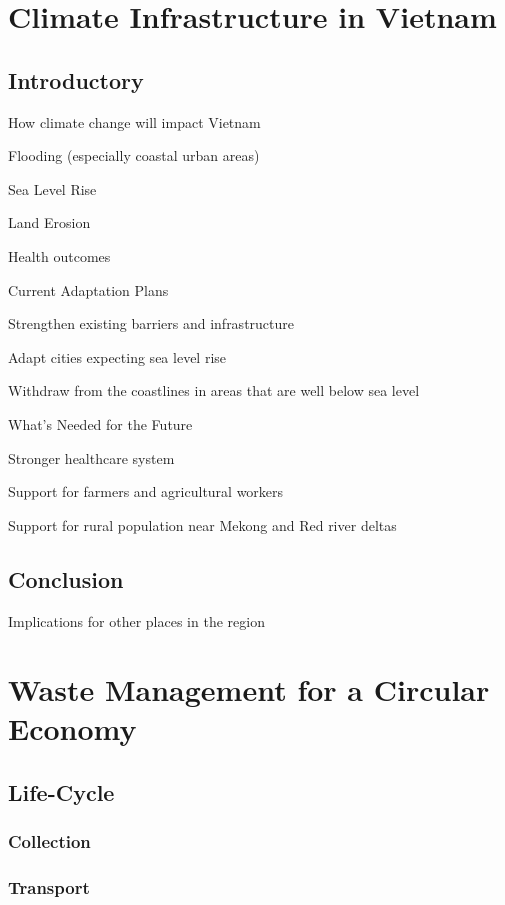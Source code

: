 \documentclass{book}\usepackage{knitr}
\begin{document}
{\chapter{Climate Infrastructure in Vietnam}

\section{Introductory}

How climate change will impact Vietnam

Flooding (especially coastal urban areas)

Sea Level Rise

Land Erosion

Health outcomes

Current Adaptation Plans

Strengthen existing barriers and infrastructure

Adapt cities expecting sea level rise

Withdraw from the coastlines in areas that are well below sea level

What's Needed for the Future

Stronger healthcare system

Support for farmers and agricultural workers

Support for rural population near Mekong and Red river deltas

\section{Conclusion}

Implications for other places in the region


\chapter{Waste Management for a Circular Economy}

\section{Life-Cycle}

\subsection{Collection}

\subsection{Transport}

}
\end{document}
